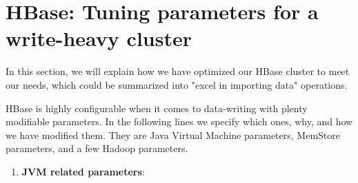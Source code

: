\section{HBase: Tuning parameters for a write-heavy cluster}

In this section, we will explain how we have optimized our HBase cluster to meet our needs, which could be summarized into "excel in importing data" operations.
\par
HBase is highly configurable when it comes to data-writing with plenty modifiable parameters. In the following lines we specify which ones, why, and how we have modified them. They are Java Virtual Machine parameters, MemStore parameters, and a few Hadoop parameters.

\begin{enumerate}

\item \textbf{JVM related parameters}:
\bigskip


\end{enumerate}
